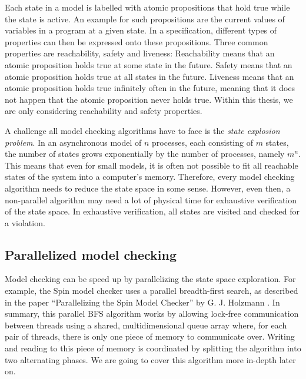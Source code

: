 \documentclass[
fancyheadings, %
%
%
]{stsreprt}
\begin{document}
Each state in a model is labelled with atomic propositions that hold true while the state is active.
An example for such propositions are the current values of variables in a program at a given state.
In a specification, different types of properties can then be expressed onto these propositions.
Three common properties are reachability, safety and liveness:
Reachability means that an atomic proposition holds true at some state in the future.
Safety means that an atomic proposition holds true at all states in the future.
Liveness means that an atomic proposition holds true infinitely often in the future, meaning that it does not happen that the atomic proposition never holds true.
Within this thesis, we are only considering reachability and safety properties.

A challenge all model checking algorithms have to face is the \emph{state explosion problem}.
In an asynchronous model of $n$ processes, each consisting of $m$ states, the number of states grows exponentially by the number of processes, namely $m^n$.
This means that even for small models, it is often not possible to fit all reachable states of the system into a computer's memory.
Therefore, every model checking algorithm needs to reduce the state space in some sense.
However, even then, a non-parallel algorithm may need a lot of physical time for exhaustive verification of the state space.
In exhaustive verification, all states are visited and checked for a violation.
\cite{Clarke2018.Introduction-to-Model-Checking,Holzmann2018.Explicit-State-Model-Checking}

\subsection{Parallelized model checking}

Model checking can be speed up by parallelizing the state space exploration.
For example, the Spin model checker uses a parallel breadth-first search, as described in the paper \enquote{Parallelizing the Spin Model Checker} by G. J. Holzmann \cite{Holzmann2012.Paralellizing-SPIN}.
In summary, this parallel BFS algorithm works by allowing lock-free communication between threads using a shared, multidimensional queue array where, for each pair of threads, there is only one piece of memory to communicate over.
Writing and reading to this piece of memory is coordinated by splitting the algorithm into two alternating phases.
We are going to cover this algorithm more in-depth later on.
\end{document}
